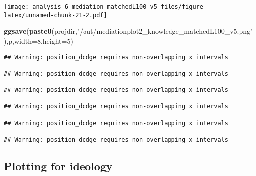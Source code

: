 \documentclass[
]{article}
\newenvironment{Shaded}{\begin{snugshade}}{\end{snugshade}}
\newcommand{\DataTypeTok}[1]{\textcolor[rgb]{0.13,0.29,0.53}{#1}}
\newcommand{\DecValTok}[1]{\textcolor[rgb]{0.00,0.00,0.81}{#1}}
\newcommand{\KeywordTok}[1]{\textcolor[rgb]{0.13,0.29,0.53}{\textbf{#1}}}
\newcommand{\NormalTok}[1]{#1}
\newcommand{\StringTok}[1]{\textcolor[rgb]{0.31,0.60,0.02}{#1}}
\begin{document}
\texttt{[image: analysis\_6\_mediation\_matchedL100\_v5\_files/figure-latex/unnamed-chunk-21-2.pdf]}

\begin{Shaded}
\begin{Highlighting}[]
\KeywordTok{ggsave}\NormalTok{(}\KeywordTok{paste0}\NormalTok{(projdir,}\StringTok{"/out/mediationplot2_knowledge_matchedL100_v5.png"}\NormalTok{),p,}\DataTypeTok{width=}\DecValTok{8}\NormalTok{,}\DataTypeTok{height=}\DecValTok{5}\NormalTok{)}
\end{Highlighting}
\end{Shaded}

\begin{verbatim}
## Warning: position_dodge requires non-overlapping x intervals

## Warning: position_dodge requires non-overlapping x intervals

## Warning: position_dodge requires non-overlapping x intervals

## Warning: position_dodge requires non-overlapping x intervals

## Warning: position_dodge requires non-overlapping x intervals

## Warning: position_dodge requires non-overlapping x intervals
\end{verbatim}

\hypertarget{plotting-for-ideology}{%
\subsection{Plotting for ideology}\label{plotting-for-ideology}}
\end{document}
